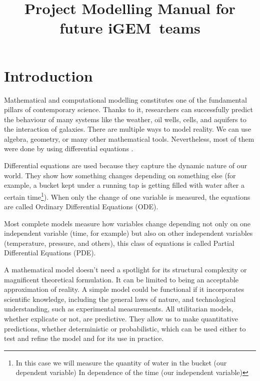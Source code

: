 \documentclass[11pt, letterpaper, english]{article}
\begin{document}
\title{Project Modelling Manual for future iGEM teams}



\nocite{*}

\newpage

\tableofcontents

\newpage 

\section{Introduction}

\par{Mathematical and computational modelling constitutes one of the fundamental pillars of contemporary science. Thanks to it, researchers can successfully predict the behaviour of many systems like the weather, oil wells, cells, and aquifers to the interaction of galaxies. There are multiple ways to model reality. We can use algebra, geometry, or many other mathematical tools. Nevertheless, most of them were done by using differential equations \cite{castillo_2012}.}

\par{Differential equations are used because they capture the dynamic nature of our world. They show how something changes depending on something else (for example, a bucket kept under a running tap is getting filled with water after a certain time\footnote{In this case we will measure the quantity of water in the bucket (our dependent variable) In dependence of the time (our independent variable)}). When only the change of one variable is measured, the equations are called Ordinary Differential Equations (ODE).}

\par{Most complete models measure how variables change depending not only on one independent variable (time, for example) but also on other independent variables (temperature, pressure, and others), this class of equations is called Partial Differential Equations (PDE).}

\par{A mathematical model doesn't need a spotlight for its structural complexity or magnificent theoretical formulation. It can be limited to being an acceptable approximation of reality. A simple model could be functional if it incorporates scientific knowledge, including the general laws of nature, and technological understanding, such as experimental measurements. All utilitarian models, whether explicate or not, are predictive. They allow us to make quantitative predictions, whether deterministic or probabilistic, which can be used either to test and refine the model and for its use in practice.}
\end{document}
